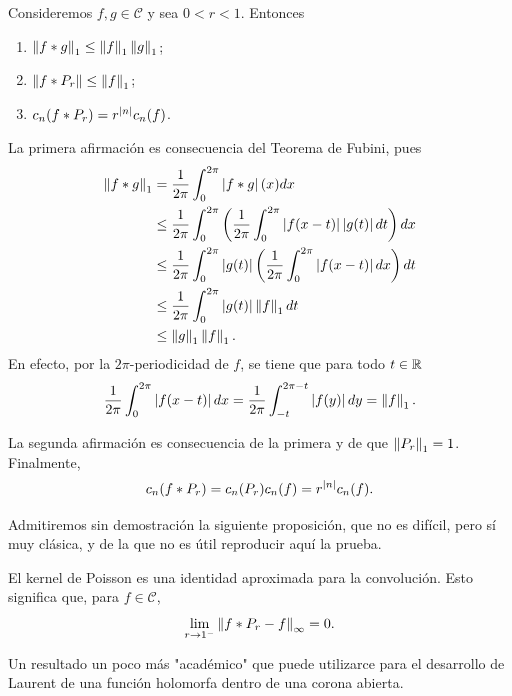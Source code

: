 \begin{prop}
    Consideremos \(f,g \in \mathcal{C}\) y sea \(0 < r < 1\). Entonces
    \begin{enumerate}
        \item \(\left\lVert f * g\right\rVert_1 \leq \left\lVert f\right\rVert_1\left\lVert g\right\rVert_1\);
        \item \(\left\lVert f * P_r\right\rVert \leq \left\lVert f\right\rVert_1\);
        \item \(c_n(f * P_r) = r^{\left\lvert n\right\rvert}c_n(f)\).
    \end{enumerate}
\end{prop}
\begin{dem}
La primera afirmación es consecuencia del Teorema de Fubini, pues
\begin{equation*}
\begin{split}
\left\lVert f * g\right\rVert_1 & = \frac{1}{2\pi} \int_{0}^{2\pi} \left\lvert f*g\right\rvert(x) dx \\
    & \leq \frac{1}{2\pi} \int_{0}^{2\pi} \left( \frac{1}{2\pi} \int_{0}^{2\pi} \left\lvert f(x-t)\right\rvert\left\lvert g(t)\right\rvert dt \right) dx \\
    & \leq \frac{1}{2\pi} \int_{0}^{2\pi} \left\lvert g(t)\right\rvert\left(\frac{1}{2\pi} \int_{0}^{2\pi} \left\lvert f(x-t)\right\rvert dx \right) dt \\
    & \leq \frac{1}{2\pi} \int_{0}^{2\pi} \left\lvert g(t)\right\rvert \left\lVert f\right\rVert_1 dt \\
    & \leq \left\lVert g\right\rVert_1\left\lVert f\right\rVert_1.
\end{split}
\end{equation*}
En efecto, por la \(2\pi\)-periodicidad de \(f\), se tiene que para todo \(t\in \mathbb{R} \)
\[
    \frac{1}{2\pi} \int_{0}^{2\pi} \left\lvert f(x-t)\right\rvert dx = \frac{1}{2\pi} \int_{-t}^{2\pi -t} \left\lvert f(y)\right\rvert dy = \left\lVert f\right\rVert_1.
\]

La segunda afirmación es consecuencia de la primera y de que \(\left\lVert P_r\right\rVert_1 = 1\). Finalmente,
\[
c_n(f * P_r) = c_n(P_r) c_n(f) = r^{\left\lvert n\right\rvert} c_n(f).
\] 
\end{dem}

Admitiremos sin demostración la siguiente proposición, que no es difícil, pero sí muy clásica, y de la que no es 
útil reproducir aquí la prueba.
\begin{prop}
    El kernel de Poisson es una identidad aproximada para la convolución. Esto significa que,
    para \(f\in \mathcal{C}\),
    \[
    \lim_{r\to 1^{-}} \left\lVert f*P_r - f\right\rVert_{\infty} = 0.
    \]
\end{prop}
Un resultado un poco más "académico" que puede utilizarce para el desarrollo de Laurent de una función holomorfa dentro 
de una corona abierta. 


